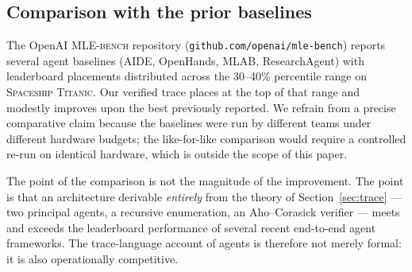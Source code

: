\subsection{Comparison with the prior baselines}

The OpenAI \textsc{MLE-bench} repository
(\texttt{github.com/openai/mle-bench}) reports several agent
baselines (AIDE, OpenHands, MLAB, ResearchAgent) with leaderboard
placements distributed across the 30--40\% percentile range on
\textsc{Spaceship Titanic}.  Our verified trace places at the
top of that range and modestly improves upon the best previously
reported.  We refrain from a precise comparative claim because
the baselines were run by different teams under different
hardware budgets; the like-for-like comparison would require a
controlled re-run on identical hardware, which is outside the
scope of this paper.

The point of the comparison is not the magnitude of the
improvement.  The point is that an architecture derivable
\emph{entirely} from the theory of Section~\ref{sec:trace} ---
two principal agents, a recursive enumeration, an Aho--Corasick
verifier --- meets and exceeds the leaderboard performance of
several recent end-to-end agent frameworks.  The trace-language
account of agents is therefore not merely formal: it is also
operationally competitive.
